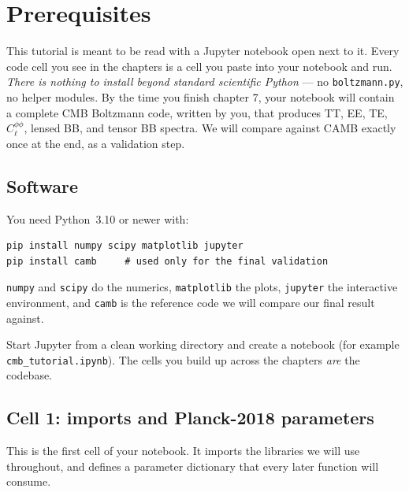 \section{Prerequisites}
\label{ch:prereq}

This tutorial is meant to be read with a Jupyter notebook open next to it. Every code cell you see in the chapters is a cell you paste into your notebook and run. \emph{There is nothing to install beyond standard scientific Python} — no \texttt{boltzmann.py}, no helper modules. By the time you finish chapter 7, your notebook will contain a complete CMB Boltzmann code, written by you, that produces TT, EE, TE, $C_\ell^{\phi\phi}$, lensed BB, and tensor BB spectra. We will compare against CAMB exactly once at the end, as a validation step.

\subsection{Software}

You need Python~3.10 or newer with:
\begin{lstlisting}[style=python]
pip install numpy scipy matplotlib jupyter
pip install camb     # used only for the final validation
\end{lstlisting}
\texttt{numpy} and \texttt{scipy} do the numerics, \texttt{matplotlib} the plots, \texttt{jupyter} the interactive environment, and \texttt{camb} is the reference code we will compare our final result against.

Start Jupyter from a clean working directory and create a notebook (for example \texttt{cmb\_tutorial.ipynb}). The cells you build up across the chapters \emph{are} the codebase.

\subsection{Cell 1: imports and Planck-2018 parameters}

This is the first cell of your notebook. It imports the libraries we will use throughout, and defines a parameter dictionary that every later function will consume.

